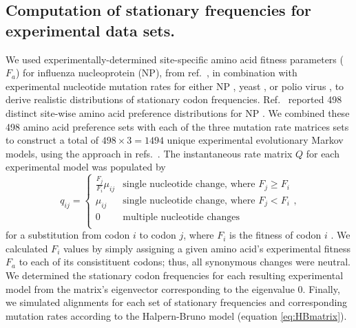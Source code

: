 \documentclass[11pt]{article}
\begin{document}
\subsection*{Computation of stationary frequencies for experimental data sets.}
We used experimentally-determined site-specific amino acid fitness parameters ($F_a$) for influenza nucleoprotein (NP), from ref.\ \cite{Bloom2014a}, in combination with experimental nucleotide mutation rates for either NP \cite{Bloom2014a}, yeast \cite{Zhu2014}, or polio virus \cite{Acevedo2014}, to derive realistic distributions of stationary codon frequencies. Ref.\ \cite{Bloom2014a} reported 498 distinct site-wise amino acid preference distributions for NP \cite{Bloom2014a}. We combined these 498 amino acid preference sets with each of the three mutation rate matrices sets to construct a total of $498 \times 3 = 1494$ unique experimental evolutionary Markov models, using the approach in refs.\ \cite{Bloom2014a,Bloom2014b}. The instantaneous rate matrix $Q$ for each experimental model was populated by 
\begin{equation}
q_{ij} =  \left\{ 
\begin{array}{rl}
  \frac{F_j}{F_i}\mu_{ij} &\mbox{single nucleotide change, where $F_j \geq F_i$} \\
  \mu_{ij}                &\mbox{single nucleotide change, where $F_j < F_i$}  \\ 
  0                       &\mbox{multiple nucleotide changes} \\        
\end{array} \right.,
\end{equation} for a substitution from codon $i$ to codon $j$, where $F_i$ is the fitness of codon $i$ \cite{Bloom2014a,Bloom2014b}. We calculated $F_i$ values by simply assigning a given amino acid's experimental fitness $F_a$ to each of its consistituent codons; thus, all synonymous changes were neutral. We determined the stationary codon frequencies for each resulting experimental model from the matrix's eigenvector corresponding to the eigenvalue 0. Finally, we simulated alignments for each set of stationary frequencies and corresponding mutation rates according to the Halpern-Bruno model (equation \eqref{eq:HBmatrix}).   

		
\end{document}
